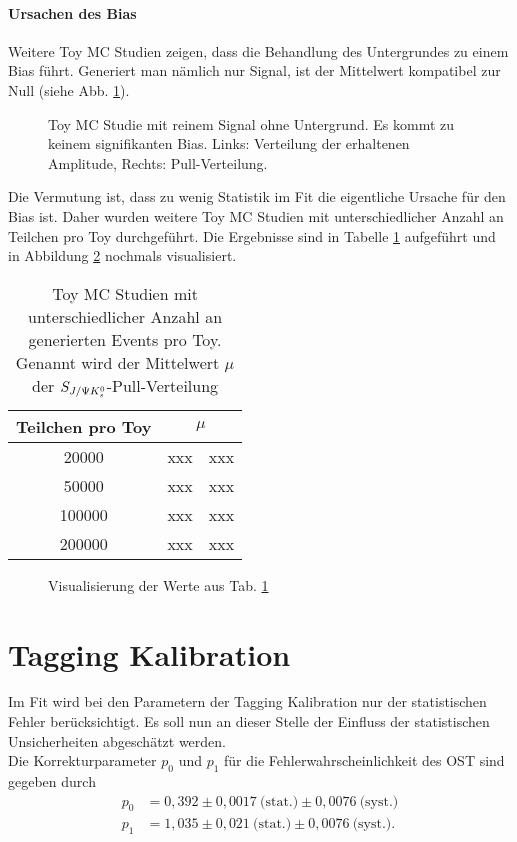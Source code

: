 \paragraph{Ursachen des Bias}
Weitere Toy MC Studien zeigen, dass die Behandlung des Untergrundes zu einem Bias führt. Generiert man nämlich nur Signal, ist der Mittelwert kompatibel zur Null (siehe Abb. \ref{fig:toys_no_bkg}).

\begin{figure}[hptb]
\centering
\caption{Toy MC Studie mit reinem Signal ohne Untergrund. Es kommt zu keinem signifikanten Bias. Links: Verteilung der erhaltenen Amplitude, Rechts: Pull-Verteilung.}
\label{fig:toys_no_bkg}
\end{figure}

Die Vermutung ist, dass zu wenig Statistik im Fit die eigentliche Ursache für den Bias ist. Daher wurden weitere Toy MC Studien mit unterschiedlicher Anzahl an Teilchen pro Toy durchgeführt. Die Ergebnisse sind in Tabelle \ref{tab:fit_bias_events} aufgeführt und in Abbildung \ref{fig:fit_bias_events} nochmals visualisiert.

\begin{table}[hptb]
\centering
\caption{Toy MC Studien mit unterschiedlicher Anzahl an generierten Events pro Toy. Genannt wird der Mittelwert $\mu$ der $S_{J/\Psi K_s^0}$-Pull-Verteilung}
\label{tab:fit_bias_events}
\begin{tabular}{cr@{$\pm$}l}
\hline \hline 
Teilchen pro Toy & \multicolumn{2}{c}{$\mu$}  \\ \hline
20000            &  xxx & xxx \\
50000            &  xxx & xxx \\
100000           &  xxx & xxx \\
200000           &  xxx & xxx \\ 
\hline \hline
\end{tabular}
\end{table}

\begin{figure}[hptb]
\centering
\caption{Visualisierung der Werte aus Tab. \ref{tab:fit_bias_events}}
\label{fig:fit_bias_events}
\end{figure}

\section{Tagging Kalibration}
Im Fit wird bei den Parametern der Tagging Kalibration nur der statistischen Fehler berücksichtigt. Es soll nun an dieser Stelle der Einfluss der statistischen Unsicherheiten abgeschätzt werden. \\
Die Korrekturparameter $p_0$ und $p_1$ für die Fehlerwahrscheinlichkeit des \gls{OST} sind gegeben durch
\begin{align}
p_0 &= 0,392 \pm 0,0017\ \text{(stat.)} \pm 0,0076\ \text{(syst.)} \\
p_1 &= 1,035 \pm 0,021\ \text{(stat.)} \pm 0,0076\ \text{(syst.)}.
\end{align}

